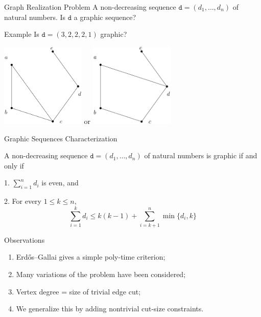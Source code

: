 \begin{frame}{Graph Realization Problem}
    {A non-decreasing sequence $\texttt{d} = (d_1, \dots, d_n)$ of natural numbers.}
    {Is $\texttt{d}$ a graphic sequence?}
\end{frame}

\begin{frame}{Example}
  \centering
  Is $\texttt{d}=(3, 2, 2, 2, 1)$ graphic?
  \pause
  \bigbreak
  \begin{minipage}{\linewidth}
    \centering
    \includegraphics[height=4cm]{images/real1.png}
    \pause
    or
    \includegraphics[height=4cm]{images/real2.png}
  \end{minipage}
\end{frame}

\begin{frame}{Graphic Sequences Characterization}
  \begin{theorem}
    A non-decreasing sequence $\texttt{d} = (d_1, \dots, d_n)$ of natural numbers is graphic if and only if \bigbreak
    
    1. $\sum\limits_{i=1}^n d_i$ is even, and \medskip

    2. For every $1 \le k \le n$,
        \[
        \sum_{i=1}^k d_i \le k(k - 1) + \sum_{i=k+1}^n \min\{d_i, k\}
        \]
  \end{theorem}
\end{frame}

\begin{frame}{Observations}
    \begin{enumerate}[-]
        \item Erd\H{o}s–Gallai gives a simple poly-time criterion;
        
        \item Many variations of the problem have been considered; 
        
        \item Vertex degree = size of trivial edge cut;
        
        \item We generalize this by adding nontrivial cut-size constraints.
    \end{enumerate}
\end{frame}

